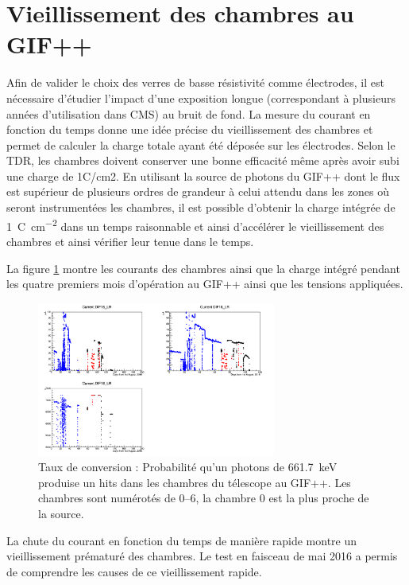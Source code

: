 \section{Vieillissement des chambres au GIF++}
Afin de valider le choix des verres de basse résistivité comme électrodes, il est nécessaire d'étudier l'impact d'une exposition longue (correspondant à plusieurs années d'utilisation dans CMS) au bruit de fond. La mesure du courant en fonction du temps donne une idée précise du vieillissement des chambres et permet de calculer la charge totale ayant été déposée sur les électrodes. Selon le TDR, les chambres doivent conserver une bonne efficacité même après avoir subi une charge de 1C/cm2. En utilisant la source de photons du GIF++ dont le flux est supérieur de plusieurs ordres de grandeur à celui attendu dans les zones où seront instrumentées les chambres, il est possible d'obtenir la charge intégrée de \SI{1}{\coulomb\per\square\centi\meter} dans un temps raisonnable et ainsi d'accélérer le vieillissement des chambres et ainsi vérifier leur tenue dans le temps.

La figure \ref{Courant} montre les courants des chambres ainsi que la charge intégré pendant les quatre premiers mois d'opération au GIF++ ainsi que les tensions appliquées. 

\begin{figure}[!ht]
	\centering
	\includegraphics[width=0.7\textwidth]{GLA/DIF16.png}
	\caption{Taux de conversion : Probabilité qu'un photons de \SI{661.7}{\kilo\eV} produise un hits dans les chambres du télescope au GIF++. Les chambres sont numérotés de \SIrange{0}{6}{}, la chambre \num{0} est la plus proche de la source.}
	\label{Courant}
\end{figure}


La chute du courant en fonction du temps de manière rapide montre un vieillissement prématuré des chambres. Le test en faisceau de mai 2016 a permis de comprendre les causes de ce vieillissement rapide.

